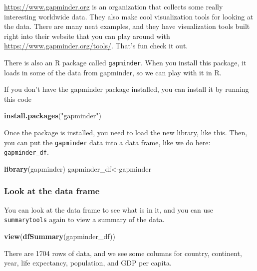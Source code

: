 \documentclass[
]{book}
\newenvironment{Shaded}{\begin{snugshade}}{\end{snugshade}}
\newcommand{\FunctionTok}[1]{\textcolor[rgb]{0.13,0.29,0.53}{\textbf{#1}}}
\newcommand{\NormalTok}[1]{#1}
\newcommand{\OtherTok}[1]{\textcolor[rgb]{0.56,0.35,0.01}{#1}}
\newcommand{\StringTok}[1]{\textcolor[rgb]{0.31,0.60,0.02}{#1}}
\begin{document}
\url{https://www.gapminder.org} is an organization that collects some really interesting worldwide data. They also make cool visualization tools for looking at the data. There are many neat examples, and they have visualization tools built right into their website that you can play around with \url{https://www.gapminder.org/tools/}. That's fun check it out.

There is also an R package called \texttt{gapminder}. When you install this package, it loads in some of the data from gapminder, so we can play with it in R.

If you don't have the gapminder package installed, you can install it by running this code

\begin{Shaded}
\begin{Highlighting}[]
\FunctionTok{install.packages}\NormalTok{(}\StringTok{"gapminder"}\NormalTok{)}
\end{Highlighting}
\end{Shaded}

Once the package is installed, you need to load the new library, like this. Then, you can put the \texttt{gapminder} data into a data frame, like we do here: \texttt{gapminder\_df}.

\begin{Shaded}
\begin{Highlighting}[]
\FunctionTok{library}\NormalTok{(gapminder)}
\NormalTok{gapminder\_df}\OtherTok{\textless{}{-}}\NormalTok{gapminder}
\end{Highlighting}
\end{Shaded}

\hypertarget{look-at-the-data-frame}{%
\subsubsection{Look at the data frame}\label{look-at-the-data-frame}}

You can look at the data frame to see what is in it, and you can use \texttt{summarytools} again to view a summary of the data.

\begin{Shaded}
\begin{Highlighting}[]
\FunctionTok{view}\NormalTok{(}\FunctionTok{dfSummary}\NormalTok{(gapminder\_df))}
\end{Highlighting}
\end{Shaded}

There are 1704 rows of data, and we see some columns for country, continent, year, life expectancy, population, and GDP per capita.
\end{document}

